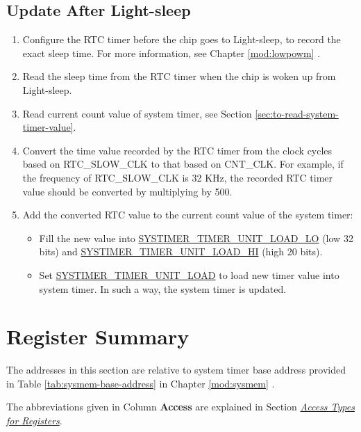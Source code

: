 \documentclass[main\_\_EN.tex]{subfiles}
\begin{document}
\subsection{Update After Light-sleep}
\begin{enumerate}
    \item Configure the RTC timer before the chip goes to Light-sleep, to record the exact sleep time. For more information, see Chapter \ref{mod:lowpowm} \textit{}.
    \item Read the sleep time from the RTC timer when the chip is woken up from Light-sleep.
    \item Read current count value of system timer, see Section \ref{sec:to-read-system-timer-value}.
    \item Convert the time value recorded by the RTC timer from the clock cycles based on RTC\_SLOW\_CLK to that based on CNT\_CLK. For example, if the frequency of RTC\_SLOW\_CLK is 32 KHz, the recorded RTC timer value should be converted by multiplying by 500.
    \item Add the converted RTC value to the current count value of the system timer:
    \begin{itemize}
        \item Fill the new value into \hyperref[fielddesc:SYSTIMERTIMERUNIT0LOADLO]{SYSTIMER\_TIMER\_UNIT\_LOAD\_LO} (low 32 bits) and \hyperref[fielddesc:SYSTIMERTIMERUNIT0LOADHI]{SYSTIMER\_TIMER\_UNIT\_LOAD\_HI} (high 20 bits).
        \item Set \hyperref[fielddesc:SYSTIMERTIMERUNIT0LOAD]{SYSTIMER\_TIMER\_UNIT\_LOAD} to load new timer value into system timer. In such a way, the system timer is updated.    \end{itemize}
\end{enumerate}



\hypertarget{systimer-reg-summ}{}
\section{Register Summary}
\label{sec:28-systimer-reg-summ}

The addresses in this section are relative to system timer base address provided in Table \ref{tab:sysmem-base-address} in Chapter \ref{mod:sysmem} \textit{}.

The abbreviations given in Column \textbf{Access} are explained in Section \hyperref[glossary-access-types]{\textit{Access Types for Registers}}.
\end{document}
